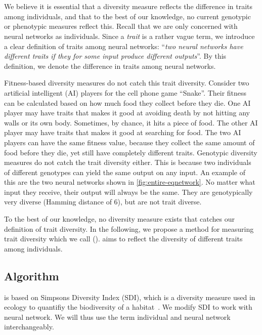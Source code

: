 \section{\di{}}
We believe it is essential that a diversity measure reflects the difference in traits among individuals, and that to the best of our knowledge, no current genotypic or phenotypic measures reflect this. Recall that we are only concerned with neural networks as individuals. Since a \emph{trait} is a rather vague term, we introduce a clear definition of traits among neural networks: ``\emph{two neural networks have different traits if they for some input produce different outputs}''. By this definition, we denote the difference in traits among neural networks.

Fitness-based diversity measures do not catch this trait diversity. Consider two artificial intelligent (AI) players for the cell phone game ``Snake''. Their fitness can be calculated based on how much food they collect before they die. One AI player may have traits that makes it good at avoiding death by not hitting any walls or its own body. Sometimes, by chance, it hits a piece of food. The other AI player may have traits that makes it good at searching for food. The two AI players can have the same fitness value, because they collect the same amount of food before they die, yet still have completely different traits. Genotypic diversity measures do not catch the trait diversity either. This is because two individuals of different genotypes can yield the same output on any input. An example of this are the two neural networks shown in \cref{fig:entire-eqnetwork}. No matter what input they receive, their output will always be the same. They are genotypically very diverse (Hamming distance of 6), but are not trait diverse.
%

%
To the best of our knowledge, no diversity measure exists that catches our definition of trait diversity. In the following, we propose a method for measuring trait diversity which we call \emph{\di{}} (\dia). \dia{} aims to reflect the diversity of different traits among individuals. 

\subsection{Algorithm}
\dia{} is based on Simpsons Diversity Index (SDI), which is a diversity measure used in ecology to quantifiy the biodiversity of a habitat~\cite{simpson1949measurement}. We modify SDI to work with neural network. We will thus use the term individual and neural network interchangeably.

